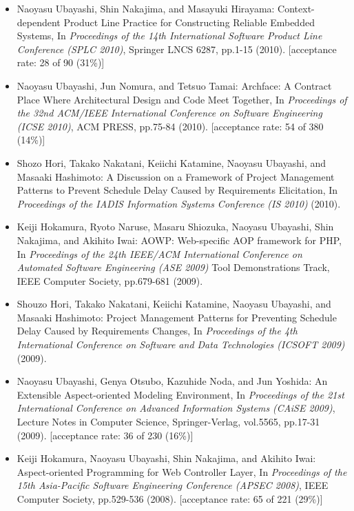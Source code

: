 \documentclass{article}
\begin{document}
\begin{itemize}
\item Naoyasu Ubayashi, Shin Nakajima, and Masayuki Hirayama:
Context-dependent Product Line Practice for Constructing Reliable Embedded Systems,
In {\em Proceedings of the 14th International Software Product Line Conference (SPLC 2010)},
Springer LNCS 6287, pp.1-15 (2010).
[acceptance rate: 28 of 90 (31\%)]

\item Naoyasu Ubayashi, Jun Nomura, and Tetsuo Tamai:
Archface: A Contract Place Where Architectural Design and Code Meet Together,
In {\em Proceedings of the 32nd ACM/IEEE International Conference on Software Engineering (ICSE 2010)},
ACM PRESS, pp.75-84 (2010).
[acceptance rate: 54 of 380 (14\%)]

\item Shozo Hori, Takako Nakatani, Keiichi Katamine, Naoyasu Ubayashi, and Masaaki Hashimoto:
A Discussion on a Framework of Project Management Patterns to Prevent Schedule Delay Caused by  Requirements Elicitation,
In {\em Proceedings of the IADIS Information Systems Conference (IS 2010)} (2010).

\item Keiji Hokamura, Ryoto Naruse, Masaru Shiozuka, Naoyasu Ubayashi, Shin Nakajima, and Akihito Iwai:
AOWP: Web-specific AOP framework for PHP,
In {\em Proceedings of the 24th IEEE/ACM International Conference on Automated Software Engineering (ASE 2009)} Tool Demonstrations Track,
IEEE Computer Society,  pp.679-681 (2009).

\item Shouzo Hori, Takako Nakatani, Keiichi Katamine, Naoyasu Ubayashi, and Masaaki Hashimoto:
Project Management Patterns for Preventing Schedule Delay Caused by Requirements Changes,
In {\em Proceedings of the 4th International Conference on Software and Data Technologies (ICSOFT 2009)} (2009).

\item Naoyasu Ubayashi, Genya Otsubo, Kazuhide Noda, and Jun Yoshida:
An Extensible Aspect-oriented Modeling Environment,
In {\em Proceedings of the 21st International Conference on Advanced Information Systems (CAiSE 2009)},
Lecture Notes in Computer Science, Springer-Verlag, vol.5565, pp.17-31 (2009).
[acceptance rate: 36 of 230 (16\%)]

\item Keiji Hokamura, Naoyasu Ubayashi, Shin Nakajima, and Akihito Iwai:
Aspect-oriented Programming for Web Controller Layer,
In {\em Proceedings of the 15th Asia-Pacific Software Engineering Conference (APSEC 2008)},
IEEE Computer Society,
pp.529-536 (2008).
[acceptance rate: 65 of 221 (29\%)]


\end{itemize}
\end{document}
